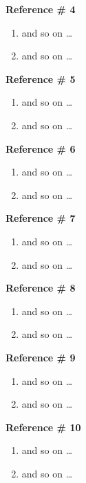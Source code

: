 \documentclass{article}
\begin{document}
\textbf{Reference \# 4}

\begin{enumerate}
    \item and so on \ldots
    \item and so on \ldots
\end{enumerate}

\textbf{Reference \# 5}

\begin{enumerate}
    \item and so on \ldots
    \item and so on \ldots
\end{enumerate}

\textbf{Reference \# 6}

\begin{enumerate}
    \item and so on \ldots
    \item and so on \ldots
\end{enumerate}

\textbf{Reference \# 7}

\begin{enumerate}
    \item and so on \ldots
    \item and so on \ldots
\end{enumerate}

\textbf{Reference \# 8}

\begin{enumerate}
    \item and so on \ldots
    \item and so on \ldots
\end{enumerate}

\textbf{Reference \# 9}

\begin{enumerate}
    \item and so on \ldots
    \item and so on \ldots
\end{enumerate}

\textbf{Reference \# 10}

\begin{enumerate}
    \item and so on \ldots
    \item and so on \ldots
\end{enumerate}

\newpage

\printbibliography[title={Works Cited}] %
\end{document}
